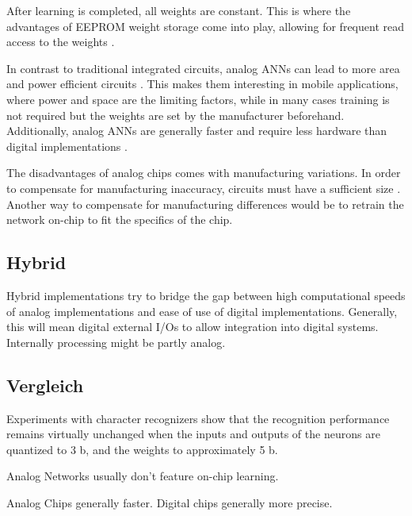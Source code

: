 \documentclass[conference]{IEEEtran}
\begin{document}
    After learning is completed, all weights are constant.
    This is where the advantages of EEPROM weight storage come into play, allowing for frequent read access to the weights \cite{holler1989electrically}.


    In contrast to traditional integrated circuits, analog ANNs can lead to more area and power efficient circuits \cite{forssell2014hardware}.
    This makes them interesting in mobile applications, where power and space are the limiting factors, while in many cases training is not required but the weights are set by the manufacturer beforehand.
    Additionally, analog ANNs are generally faster and require less hardware than digital implementations \cite{hollis1990artificial}.

    The disadvantages of analog chips comes with manufacturing variations.
    In order to compensate for manufacturing inaccuracy, circuits must have a sufficient size \cite{forssell2014hardware}.
    Another way to compensate for manufacturing differences would be to retrain the network on-chip to fit the specifics of the chip.

    \subsection{Hybrid}

    Hybrid implementations try to bridge the gap between high computational speeds of analog implementations and ease of use of digital implementations.
    Generally, this will mean digital external I/Os to allow integration into digital systems.
    Internally processing might be partly analog.

    \subsection{Vergleich}
    Experiments with character recognizers show that the recognition performance remains virtually unchanged when the inputs and outputs of
    the neurons are quantized to 3 b, and the weights to approximately 5 b. \cite{boser1991analog}

    Analog Networks usually don't feature on-chip learning. \cite{ms1990digital}

    Analog Chips generally faster.
    Digital chips generally more precise.
\end{document}
